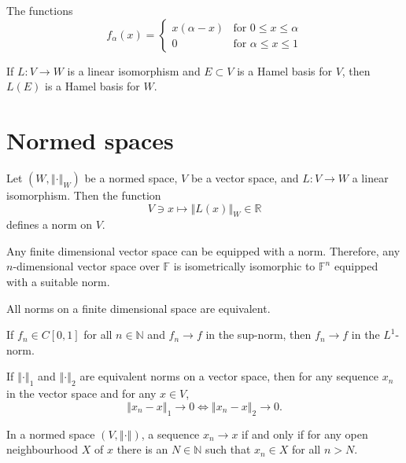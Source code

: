 \documentclass[a4paper]{article}
\newcommand{\N}{\mathbb{N}}
\newcommand{\F}{\mathbb{F}}
\newcommand{\R}{\mathbb{R}}
\newcommand{\norm}[1]{\left\Vert #1 \right\Vert}
\newcommand{\<}{\langle}
\renewcommand{\>}{\rangle}
\renewcommand{\a}{\alpha}
\begin{document}
\begin{ex}
  The functions
  $$f_\a(x) =
  \begin{cases}
    x(\a - x) &\text{for }0\leq x\leq\a\\
    0 &\text{for }\a\leq x\leq 1
  \end{cases}$$
\end{ex}

\begin{ex}
  If $L:V\to W$ is a linear isomorphism and $E\subset V$ is a Hamel basis for $V$, then $L(E)$ is a Hamel basis for $W$.
\end{ex}

\section{Normed spaces}

\begin{prop}
  Let $(W,\norm{\cdot}_W)$ be a normed space, $V$ be a vector space, and $L:V\to W$ a linear isomorphism. Then the function
  $$V\ni x\mapsto \norm{L(x)}_W \in\R$$
  defines a norm on $V$.
\end{prop}

\begin{prop}
  Any finite dimensional vector space can be equipped with a norm. Therefore, any $n$-dimensional vector space over $\F$ is isometrically isomorphic to $\F^n$ equipped with a suitable norm.
\end{prop}

\begin{thm}
  All norms on a finite dimensional space are equivalent.
\end{thm}

\begin{prop}
If $f_n\in C[0,1]$ for all $n\in\N$ and $f_n\to f$ in the sup-norm, then $f_n\to f$ in the $L^1$-norm.
\end{prop}

\begin{prop}
  If $\norm{\cdot}_1$ and $\norm{\cdot}_2$  are equivalent norms on a vector space, then for any sequence $x_n$ in the vector space and for any $x\in V$,
  $$\norm{x_n-x}_1\to0 \iff \norm{x_n-x}_2\to0.$$
\end{prop}

\begin{lemma}
  In a normed space $(V,\norm{\cdot})$, a sequence $x_n\to x$ if and only if for any open neighbourhood $X$ of $x$ there is an $N\in\N$ such that $x_n\in X$ for all $n>N$.
\end{lemma}
\end{document}
